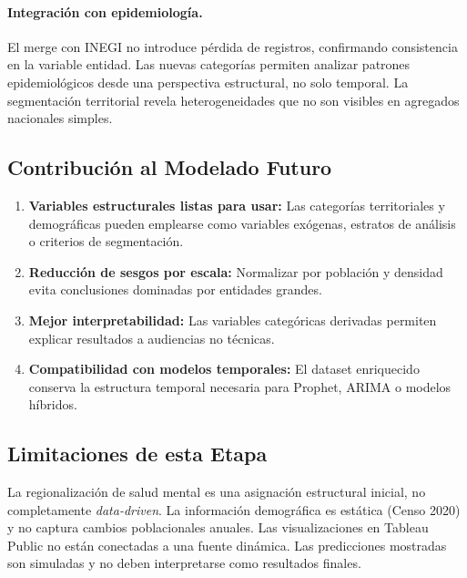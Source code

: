 \documentclass[12pt,letterpaper]{article}
\begin{document}
\paragraph{Integración con epidemiología.}
El merge con INEGI no introduce pérdida de registros, confirmando consistencia en la variable entidad. Las nuevas categorías permiten analizar patrones epidemiológicos desde una perspectiva estructural, no solo temporal. La segmentación territorial revela heterogeneidades que no son visibles en agregados nacionales simples.

\subsection{Contribución al Modelado Futuro}

\begin{enumerate}
    \item \textbf{Variables estructurales listas para usar:} Las categorías territoriales y demográficas pueden emplearse como variables exógenas, estratos de análisis o criterios de segmentación.
    \item \textbf{Reducción de sesgos por escala:} Normalizar por población y densidad evita conclusiones dominadas por entidades grandes.
    \item \textbf{Mejor interpretabilidad:} Las variables categóricas derivadas permiten explicar resultados a audiencias no técnicas.
    \item \textbf{Compatibilidad con modelos temporales:} El dataset enriquecido conserva la estructura temporal necesaria para Prophet, ARIMA o modelos híbridos.
\end{enumerate}

\subsection{Limitaciones de esta Etapa}

La regionalización de salud mental es una asignación estructural inicial, no completamente \textit{data-driven}. La información demográfica es estática (Censo 2020) y no captura cambios poblacionales anuales. Las visualizaciones en Tableau Public no están conectadas a una fuente dinámica. Las predicciones mostradas son simuladas y no deben interpretarse como resultados finales.

\newpage

\end{document}
